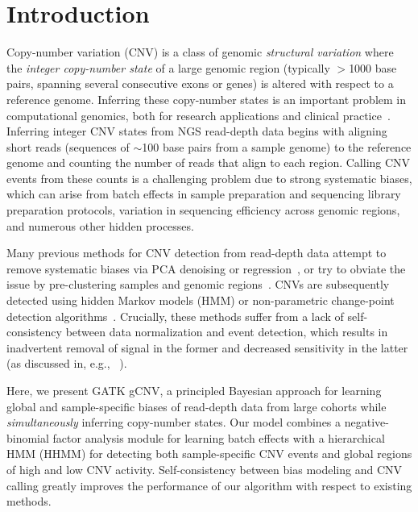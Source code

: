 \documentclass[sigplan]{acmart}\settopmatter{printfolios=true,printccs=false,printacmref=false}
\begin{document}
\renewcommand{\thefootnote}{\fnsymbol{footnote}}

\section{Introduction}
Copy-number variation (CNV) is a class of genomic {\em structural variation} where the {\em integer copy-number state} of a large genomic region (typically $>$1000 base pairs, spanning several consecutive exons or genes) is altered with respect to a reference genome.  Inferring these copy-number states is an important problem in computational genomics, both for research applications and clinical practice~\cite{zhang2009copy}. Inferring integer CNV states from NGS read-depth data begins with aligning short reads (sequences of $\sim$100 base pairs from a sample genome) to the reference genome and counting the number of reads that align to each region.  Calling CNV events from these counts is a challenging problem due to strong systematic biases, which can arise from batch effects in sample preparation and sequencing library preparation protocols, variation in sequencing efficiency across genomic regions, and numerous other hidden processes.

Many previous methods for CNV detection from read-depth data attempt to remove systematic biases via PCA denoising \cite{fromer_discovery_2012} or regression~\cite{jiang_codex:_2015, klambauer_cn.mops:_2012}, or try to obviate the issue by pre-clustering samples and genomic regions~\cite{handsaker_large_2015, packer_clamms:_2016}.  CNVs are subsequently detected using hidden Markov models (HMM) or non-parametric change-point detection algorithms~\cite{olshen_circular_2004}. Crucially, these methods suffer from a lack of self-consistency between data normalization and event detection, which results in inadvertent removal of signal in the former and decreased sensitivity in the latter (as discussed in, e.g., ~\cite{jiang_codex:_2015}).

Here, we present GATK gCNV, a principled Bayesian approach for learning global and sample-specific biases of read-depth data from large cohorts while {\em simultaneously} inferring copy-number states. Our model combines a negative-binomial factor analysis module for learning batch effects with a hierarchical HMM (HHMM) for detecting both sample-specific CNV events and global regions of high and low CNV activity.  Self-consistency between bias modeling and CNV calling greatly improves the performance of our algorithm with respect to existing methods.
\end{document}
